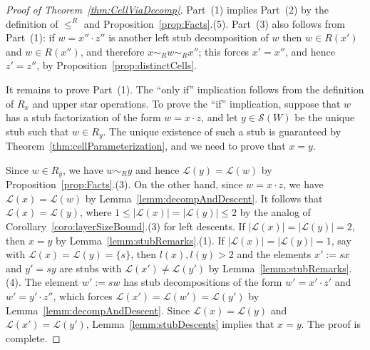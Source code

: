 \documentclass[ALCO,Unicode,published]{cedram}
\newcommand{\call}{\mathcal{L}}
\newcommand{\sw}{\mathcal{S}(W)}
\newcommand{\abs}[1]{\lvert #1 \rvert}
\begin{document}
\begin{proof}[Proof of Theorem~\ref{thm:CellViaDecomp}]
    Part~(1) implies Part~(2) by the definition of $\le^R$ and Proposition~\ref{prop:Facts}.(5). Part~(3) also
    follows from Part~(1): if $w=x''\cdot z''$ is another left stub decomposition of $w$ then $w\in
    R(x')$ and $w\in R(x'')$, and therefore $x\sim_R w\sim_R x''$; this forces $x'=x''$, and hence
    $z'=z''$, by Proposition~\ref{prop:distinctCells}.

    It remains to prove Part~(1). The ``only if'' implication follows from the definition of $R_x$
    and upper star operations. To prove the ``if'' implication, suppose that $w$ has a stub
    factorization of the form $w=x\cdot z$, and let $y\in \sw$ be the unique stub such that $w\in
    R_y$. The unique existence of such a stub is guaranteed by Theorem~\ref{thm:cellParameterization}, and
    we need to prove that $x=y$.

    Since $w\in R_y$, we have $w\sim_R y$ and hence  $\call(y)=\call(w)$ by Proposition~\ref{prop:Facts}.(3).
    On the other hand, since $w=x\cdot z$, we have $\call(x)=\call(w)$ by
    Lemma~\ref{lemm:decompAndDescent}. It follows that $\call(x)=\call(y)$, where $1\le
    \abs{\call(x)}=\abs{\call(y)}\le 2$ by the analog of Corollary~\ref{coro:layerSizeBound}.(3) for left
    descents. If $\abs{\call(x)}=\abs{\call(y)}=2$, then $x=y$ by Lemma~\ref{lemm:stubRemarks}.(1).  If
    $\abs{\call(x)}=\abs{\call(y)}=1$, say with $\call(x)=\call(y)=\{s\}$, then $l(x),l(y)>2$ and
    the elements $x':=sx$ and $y'=sy$ are stubs with $\call(x')\neq \call(y')$ by
    Lemma~\ref{lemm:stubRemarks}.(4). The element $w':=sw$ has stub decompositions of the form
    $w'=x'\cdot z'$ and $w'=y'\cdot z''$, which forces $\call(x')=\call(w')=\call(y')$ by
    Lemma~\ref{lemm:decompAndDescent}. Since $\call(x)=\call(y)$ and $\call(x')=\call(y')$,
    Lemma~\ref{lemm:stubDescents} implies that $x=y$.  The proof is complete.  
\end{proof}
\end{document}
